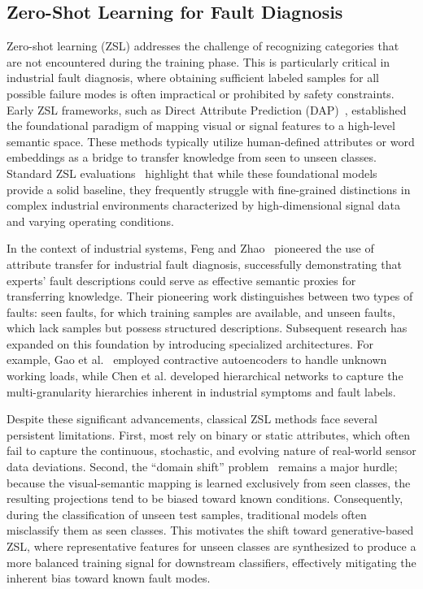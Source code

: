 \documentclass[journal,12pt,onecolumn]{IEEEtran}
\begin{document}
\subsection{Zero-Shot Learning for Fault Diagnosis}
Zero-shot learning (ZSL) addresses the challenge of recognizing categories that are not encountered during the training phase. This is particularly critical in industrial fault diagnosis, where obtaining sufficient labeled samples for all possible failure modes is often impractical or prohibited by safety constraints. Early ZSL frameworks, such as Direct Attribute Prediction (DAP)~\cite{lampert2009learning}, established the foundational paradigm of mapping visual or signal features to a high-level semantic space. These methods typically utilize human-defined attributes or word embeddings as a bridge to transfer knowledge from seen to unseen classes. Standard ZSL evaluations~\cite{xian2019zero} highlight that while these foundational models provide a solid baseline, they frequently struggle with fine-grained distinctions in complex industrial environments characterized by high-dimensional signal data and varying operating conditions.

In the context of industrial systems, Feng and Zhao~\cite{feng2021fault} pioneered the use of attribute transfer for industrial fault diagnosis, successfully demonstrating that experts' fault descriptions could serve as effective semantic proxies for transferring knowledge. Their pioneering work distinguishes between two types of faults: seen faults, for which training samples are available, and unseen faults, which lack samples but possess structured descriptions. Subsequent research has expanded on this foundation by introducing specialized architectures. For example, Gao et al.~\cite{gao2019contractive} employed contractive autoencoders to handle unknown working loads, while Chen et al. developed hierarchical networks to capture the multi-granularity hierarchies inherent in industrial symptoms and fault labels.

Despite these significant advancements, classical ZSL methods face several persistent limitations. First, most rely on binary or static attributes, which often fail to capture the continuous, stochastic, and evolving nature of real-world sensor data deviations. Second, the ``domain shift'' problem~\cite{fu2015transductive} remains a major hurdle; because the visual-semantic mapping is learned exclusively from seen classes, the resulting projections tend to be biased toward known conditions. Consequently, during the classification of unseen test samples, traditional models often misclassify them as seen classes. This motivates the shift toward generative-based ZSL, where representative features for unseen classes are synthesized to produce a more balanced training signal for downstream classifiers, effectively mitigating the inherent bias toward known fault modes.
\end{document}
